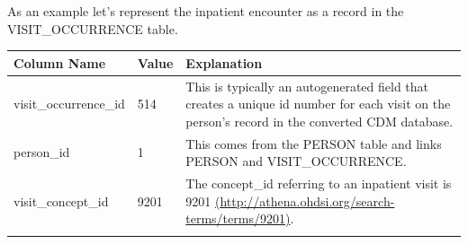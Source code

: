 \documentclass[]{book}
\begin{document}
As an example let's represent the inpatient encounter as a record in the VISIT\_OCCURRENCE table.

\begin{longtable}[]{@{}lll@{}}
\toprule
\begin{minipage}[b]{0.25\columnwidth}\raggedright
Column Name\strut
\end{minipage} & \begin{minipage}[b]{0.17\columnwidth}\raggedright
Value\strut
\end{minipage} & \begin{minipage}[b]{0.50\columnwidth}\raggedright
Explanation\strut
\end{minipage}\tabularnewline
\midrule
\endhead
\begin{minipage}[t]{0.25\columnwidth}\raggedright
visit\_occurrence\_id\strut
\end{minipage} & \begin{minipage}[t]{0.17\columnwidth}\raggedright
514\strut
\end{minipage} & \begin{minipage}[t]{0.50\columnwidth}\raggedright
This is typically an autogenerated field that creates a unique id number for each visit on the person's record in the converted CDM database.\strut
\end{minipage}\tabularnewline
\begin{minipage}[t]{0.25\columnwidth}\raggedright
person\_id\strut
\end{minipage} & \begin{minipage}[t]{0.17\columnwidth}\raggedright
1\strut
\end{minipage} & \begin{minipage}[t]{0.50\columnwidth}\raggedright
This comes from the PERSON table and links PERSON and VISIT\_OCCURRENCE.\strut
\end{minipage}\tabularnewline
\begin{minipage}[t]{0.25\columnwidth}\raggedright
visit\_concept\_id\strut
\end{minipage} & \begin{minipage}[t]{0.17\columnwidth}\raggedright
9201\strut
\end{minipage} & \begin{minipage}[t]{0.50\columnwidth}\raggedright
The concept\_id referring to an inpatient visit is 9201 \href{http://athena.ohdsi.org/search-terms/terms/9201}{(http://athena.ohdsi.org/search-terms/terms/9201)}.\strut
\end{minipage}\tabularnewline
\begin{minipage}[t]{0.25\columnwidth}\raggedright

\end{minipage}
\end{longtable}
\end{document}
